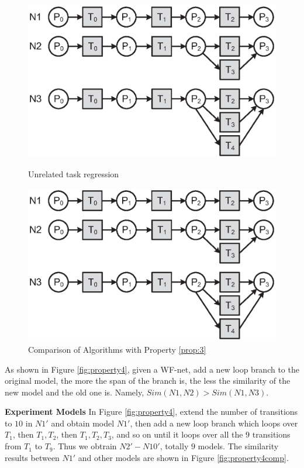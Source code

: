 \documentclass{llncs}
\begin{document}
\begin{figure}[ht]
\centering
\begin{minipage}[t]{0.45\textwidth}
	\centering
	\includegraphics[width=1\textwidth]{fig_property_3.eps}
	\caption{Unrelated task regression}
	\label{fig:property3}
\end{minipage}
\hspace{0.1in}
\begin{minipage}[t]{0.45\textwidth}
	\centering
	\includegraphics[width=1\textwidth]{fig_property_3.eps}
	\caption{Comparison of Algorithms with Property \ref{prop:3}}
	\label{fig:property3comp}
\end{minipage}
\end{figure}

\begin{property}\label{prop:4}
As shown in Figure \ref{fig:property4}, given a WF-net, add a new loop branch to the original model, the more the span of the branch is, the less the similarity of the new model and the old one is. Namely, $Sim(N1,N2)>Sim(N1,N3)$.
\end{property}
\textbf{Experiment Models} In Figure \ref{fig:property4}, extend the number of transitions to $10$ in $N1'$ and obtain model $N1'$, then add a new loop branch which loops over $T_{1}$, then $T_{1},T_{2}$, then $T_{1},T_{2},T_{3}$, and so on until it loops over all the $9$ transitions from $T_{1}$ to $T_{9}$. Thus we obtrain $N2'-N10'$, totally $9$ models. The similarity results between $N1'$ and other models are shown in Figure \ref{fig:property4comp}.
\end{document}
